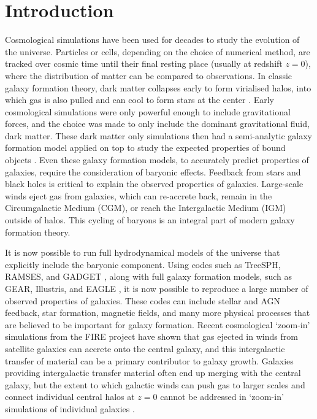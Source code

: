 \section{Introduction}
\label{sec:introduction}
Cosmological simulations have been used for decades to study the evolution of
the universe. Particles or cells, depending on the choice of numerical
method, are tracked over cosmic time until their final resting place (usually
at redshift $z=0$), where the distribution of matter can be compared to
observations. In classic galaxy formation theory, dark matter collapses early
to form virialised halos, into which gas is also pulled and can cool to form
stars at the center \citep{Mo2010}. Early cosmological simulations were only
powerful enough to include gravitational forces, and the choice was made to
only include the dominant gravitational fluid, dark matter. These dark matter
only simulations \citep[see e.g.][]{Frenk1988, Springel2005a}
then had a semi-analytic galaxy formation model applied on top to study the
expected properties of bound objects \citep[see e.g.][]{Porter2014,
Henriques2015, Lacey2016}. Even these galaxy formation models, to
accurately predict properties of galaxies, require the consideration of
baryonic effects. Feedback from stars and black holes is critical to explain
the observed properties of galaxies. Large-scale winds eject gas from
galaxies, which can re-accrete back, remain in the Circumgalactic Medium
(CGM), or reach the Intergalactic Medium (IGM) outside of halos. This cycling
of baryons is an integral part of modern galaxy formation theory.

It is now possible to run full hydrodynamical models of the universe that
explicitly include the baryonic component. Using codes such as TreeSPH,
RAMSES, and GADGET \citep{Hernquist1989, Teyssier2002, Springel2005b}, along
with full galaxy formation models, such as GEAR, Illustris, and EAGLE
\citep{Revaz2012, Vogelsberger2014, Schaye2015}, it is now
possible to reproduce a large number of observed properties of galaxies.
These codes can include stellar and AGN feedback, star formation, magnetic
fields, and many more physical processes that are believed to be important
for galaxy formation. Recent cosmological `zoom-in' simulations from the FIRE
project \citep{Hopkins2014} have shown that gas ejected in winds from
satellite galaxies can accrete onto the central galaxy, and this
intergalactic transfer of material can be a primary contributor to galaxy
growth. Galaxies providing intergalactic transfer material often end up
merging with the central galaxy, but the extent to which galactic winds can
push gas to larger scales and connect individual central halos at $z=0$
cannot be addressed in `zoom-in' simulations of individual galaxies
\citep{AnglesAlcazar2017}.

